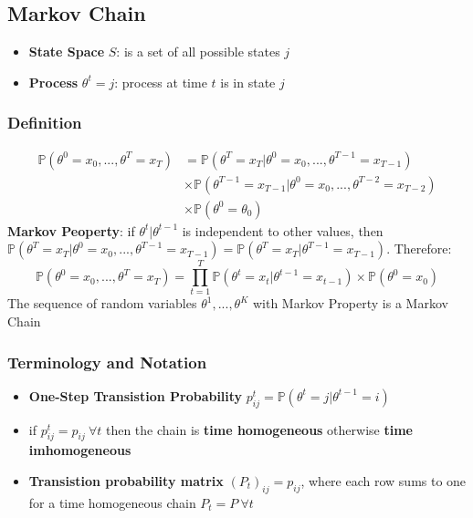 \documentclass[12pt]{article}
\theoremstyle{definition}
\newcommand{\Prob}[1]{\mathbb{P}(#1)}
\begin{document}
    \subsection*{Markov Chain}
        \begin{itemize}
            \item \textbf{State Space} $S$: is a set of all possible states $j$
            \item \textbf{Process} $\theta^t = j$: process at time $t$ is in state $j$
        \end{itemize}
        \subsubsection*{Definition}
        \begin{align*}
            \Prob{\theta^0 = x_0,..., \theta^T = x_T} &= \Prob{\theta^T = x_T|\theta^0 = x_0,...,\theta^{T-1} = x_{T-1}}\\
                &\times \Prob{\theta^{T-1} = x_{T-1}|\theta^0 = x_0,...,\theta^{T-2} = x_{T-2}}\\
                &\times \Prob{\theta^0 = \theta_0}
        \end{align*} 
        \textbf{Markov Peoperty}: if $\theta^t|\theta^{t-1}$ is independent to other values, then\\$\Prob{\theta^T = x_T|\theta^0 = x_0,...,\theta^{T-1} = x_{T-1}} = \Prob{\theta^T = x_T|\theta^{T-1} = x_{T-1}}$. Therefore:
        $$\Prob{\theta^0 = x_0,..., \theta^T = x_T} = \prod_{t=1}^T\Prob{\theta^{t} = x_t|\theta^{t-1} = x_{t-1}} \times \Prob{\theta^0 = x_0}$$
        The sequence of random variables $\theta^1,..., \theta^K$ with Markov Property is a Markov Chain
        \subsubsection*{Terminology and Notation}
        \begin{itemize}
            \item \textbf{One-Step Transistion Probability} $p_{ij}^t = \Prob{\theta^t = j|\theta^{t-1} = i}$
            \item if $p_{ij}^t = p_{ij}\ \forall t$ then the chain is \textbf{time homogeneous} otherwise \textbf{time imhomogeneous}
            \item \textbf{Transistion probability matrix} $(P_t)_{ij} = p_{ij}$, where each row sums to one 
                \subitem for a time homogeneous chain $P_t = P \ \forall t$
        \end{itemize}
        \newpage
\end{document}
